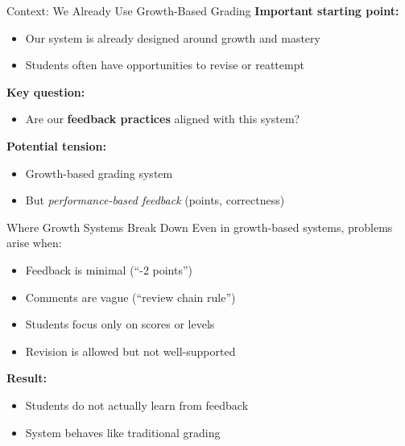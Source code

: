 \documentclass[dvipsnames]{beamer}
\begin{document}
\begin{frame}{Context: We Already Use Growth-Based Grading}
\textbf{Important starting point:}
\begin{itemize}
\item Our system is already designed around growth and mastery
\item Students often have opportunities to revise or reattempt
\end{itemize}

\vspace{1em}

\textbf{Key question:}
\begin{itemize}
\item Are our \textbf{feedback practices} aligned with this system?
\end{itemize}

\vspace{1em}

\textbf{Potential tension:}
\begin{itemize}
\item Growth-based grading system
\item But \textit{performance-based feedback} (points, correctness)
\end{itemize}
\end{frame}


\begin{frame}{Where Growth Systems Break Down}
Even in growth-based systems, problems arise when:
\begin{itemize}
\item Feedback is minimal (“-2 points”)
\item Comments are vague (“review chain rule”)
\item Students focus only on scores or levels
\item Revision is allowed but not well-supported
\end{itemize}

\vspace{1em}

\textbf{Result:}
\begin{itemize}
\item Students do not actually learn from feedback
\item System behaves like traditional grading
\end{itemize}
\end{frame}
\end{document}

